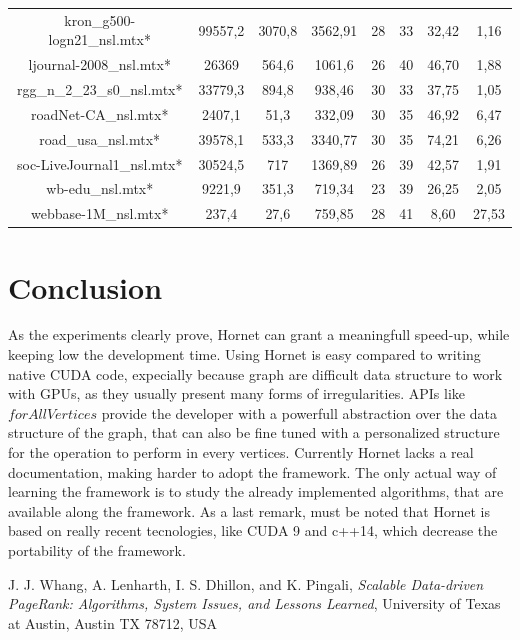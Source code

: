 \documentclass[journal]{IEEEtran}
\begin{document}
\begin{table}[]
\begin{tabular}{|c|c|c|c|c|c|c|c|}
kron\_g500-logn21\_nsl.mtx*  & 99557,2        & 3070,8     & 3562,91     & 28                & 33                 & 32,42              & 1,16                   \\
ljournal-2008\_nsl.mtx*      & 26369          & 564,6      & 1061,6      & 26                & 40                 & 46,70              & 1,88                   \\
rgg\_n\_2\_23\_s0\_nsl.mtx*  & 33779,3        & 894,8      & 938,46      & 30                & 33                 & 37,75              & 1,05                   \\
roadNet-CA\_nsl.mtx*         & 2407,1         & 51,3       & 332,09      & 30                & 35                 & 46,92              & 6,47                   \\
road\_usa\_nsl.mtx*          & 39578,1        & 533,3      & 3340,77     & 30                & 35                 & 74,21              & 6,26                   \\
soc-LiveJournal1\_nsl.mtx*   & 30524,5        & 717        & 1369,89     & 26                & 39                 & 42,57              & 1,91                   \\
wb-edu\_nsl.mtx*             & 9221,9         & 351,3      & 719,34      & 23                & 39                 & 26,25              & 2,05                   \\
webbase-1M\_nsl.mtx*         & 237,4          & 27,6       & 759,85      & 28                & 41                 & 8,60               & 27,53                 \\
\hline
\end{tabular}
\end{table}

\section{Conclusion}
As the experiments clearly prove, Hornet can grant a meaningfull speed-up,
while keeping low the development time.
Using Hornet is easy compared to writing native CUDA code, expecially because
graph are difficult data structure to work with GPUs, as they usually present 
many forms of irregularities. APIs like $forAllVertices$ provide the developer
with a powerfull abstraction over the data structure of the graph, that can
also be fine tuned with a personalized structure for the operation to
perform in every vertices. Currently Hornet lacks a real documentation, making
harder to adopt the framework. The only actual way of learning the framework
is to study the already implemented algorithms, that are available along
the framework.
As a last remark, must be noted that Hornet is based on really recent tecnologies,
like CUDA 9 and c++14, which decrease the portability of the framework.

\begin{thebibliography}{1}

J. J. Whang, A. Lenharth, I. S. Dhillon, and K. Pingali, \emph{Scalable Data-driven PageRank: Algorithms, System Issues, and Lessons Learned}, University of Texas at Austin, Austin TX 78712, USA

\end{thebibliography}
\end{document}
